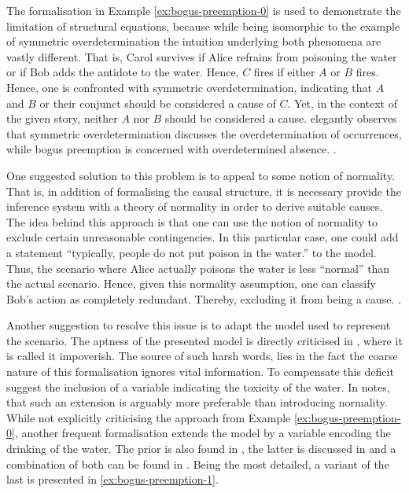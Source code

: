 \documentclass[11pt,a4paper]{book}
\theoremstyle{definition}
\theoremstyle{definition}
\theoremstyle{definition}
\theoremstyle{remark}
\begin{document}
The formalisation in Example \ref{ex:bogus-preemption-0} is used to demonstrate the limitation of structural equations, because while being isomorphic to the example of symmetric overdetermination the intuition underlying both 
phenomena are vastly different.
That is, Carol survives if Alice refrains from poisoning the water or if Bob adds the antidote to the water. Hence, $C$ fires if either $A$ or $B$ fires. Hence, one is confronted with symmetric overdetermination, indicating that $A$ and $B$ or their conjunct should be considered a cause of $C$. Yet, in the context of the given story, neither $A$ nor $B$ should be considered a cause.
\parencite{baumgartner2013regularity} elegantly observes that symmetric overdetermination discusses the overdetermination of occurrences, while bogus preemption is concerned with overdetermined absence.
 \parencite{halpern2011actual,weslake2015partial,halpern2015graded}.

One suggested solution to this problem is to appeal to some notion of normality. That is, in addition of formalising the causal structure, it is necessary provide the inference system with a theory of normality in order to derive suitable causes.
The idea behind this approach is that one can use the notion of normality to exclude certain unreasonable contingencies.
In this particular case, one could add a statement ``typically, people do not put poison in the water.'' to the model. Thus, the scenario where Alice actually poisons the water is less ``normal'' than the actual scenario. 
Hence, given this normality assumption, one can classify Bob's action as completely redundant. Thereby, excluding it from being a cause.
\parencite{halpern2011actual,halpern2015graded}.


Another suggestion to resolve this issue is to adapt the model used to represent the scenario. 
The aptness of the presented model is directly criticised in \parencite{blanchard2017cause}, where it is called it impoverish.
The source of such harsh words, lies in the fact the coarse nature of this formalisation ignores vital information.
To compensate this deficit \parencite{blanchard2017cause} suggest the inclusion of a variable indicating the toxicity of the water. 
In \parencite{halpern2015graded} notes, that such an extension is arguably more preferable than introducing normality.
While not explicitly criticising the approach from Example \ref{ex:bogus-preemption-0}, another frequent formalisation extends the model by a variable encoding the drinking of the water.
The prior is also found in \parencite{bochman2018actual,halpern2015graded}, the latter is discussed in \parencite{denecker2018causal,denecker2019explaining} and a combination of both can be found in 
\parencite{beckers2018principled}.
Being the most detailed, a variant of the last is presented in \ref{ex:bogus-preemption-1}. 
\end{document}
